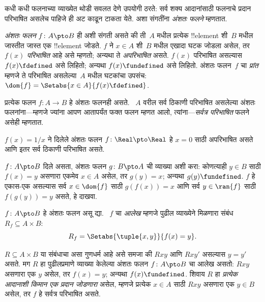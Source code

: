 \documentclass[../../../include/open-logic-section]{subfiles}
\begin{document}


\begin{explain}
कधी कधी फलनाच्या व्याख्येत थोडी सवलत देणे उपयोगी ठरते: सर्व शक्य
आदानांसाठी फलनाचे प्रदान परिभाषित असलेच पाहिजे ही अट काढून टाकता
येते. अशा संगतींना \emph{अंशतः फलने} म्हणतात.
\end{explain}

\begin{defn}
\emph{अंशतः फलन} $f \colon A \pto B$ ही अशी संगती असते की ती~$A$
मधील प्रत्येक !!{element} शी~$B$ मधील जास्तीत जास्त एक !!{element}
जोडते. $f$ ने $x \in A$ शी~$B$ मधील एखादा घटक जोडला असेल, तर
$f(x)$ \emph{परिभाषित} आहे असे म्हणतो; अन्यथा ते \emph{अपरिभाषित}
असते. $f(x)$ परिभाषित असल्यास $f(x) \fdefined$ असे लिहितो;
अन्यथा $f(x) \fundefined$ असे लिहितो. अंशतः फलन~$f$ चा \emph{प्रांत}
म्हणजे ते परिभाषित असलेल्या~$A$ मधील घटकांचा उपसंच:
$\dom{f} = \Setabs{x \in A}{f(x) \fdefined}$.
\end{defn}

\begin{ex}
प्रत्येक फलन $f\colon A \to B$ हे अंशतः फलनही असते. ~$A$ वरील
सर्व ठिकाणी परिभाषित असलेल्या अंशतः फलनांना---म्हणजे ज्यांना आपण
आतापर्यंत फक्त फलन म्हणत आलो, त्यांना---\emph{सर्वत्र परिभाषित}
फलने असेही म्हणतात.
\end{ex}

\begin{ex}
$f(x) = 1/x$ ने दिलेले अंशतः फलन $f \colon \Real \pto \Real$
हे $x = 0$ साठी अपरिभाषित असते आणि इतर सर्व ठिकाणी परिभाषित असते.
\end{ex}

\begin{prob}
$f\colon A \pto B$ दिले असता, अंशतः फलन $g\colon B \pto A$ ची
व्याख्या अशी करा: कोणत्याही $y \in B$ साठी $f(x) = y$ असणारा एकमेव
$x \in A$ असेल, तर $g(y) = x$; अन्यथा $g(y) \fundefined$.
$f$ हे एकास-एक असल्यास सर्व $x \in \dom{f}$ साठी $g(f(x)) = x$
आणि सर्व $y \in \ran{f}$ साठी $f(g(y)) = y$ असते, हे दाखवा.
\end{prob}

\begin{defn}[अंशतः फलनाचा आलेख]
$f\colon A \pto B$ हे अंशतः फलन असू द्या. ~$f$ चा \emph{आलेख}
म्हणजे पुढील व्याख्येने मिळणारा संबंध $R_f \subseteq A \times B$:
\[
R_f = \Setabs{\tuple{x,y}}{f(x) = y}.
\]
\end{defn}

\begin{prop}
$R \subseteq A \times B$ या संबंधाचा असा गुणधर्म आहे असे समजा की
$Rxy$ आणि $Rxy'$ असल्यास $y = y'$ असते. मग $R$ हा पुढीलप्रमाणे
व्याख्या केलेल्या अंशतः फलन $f\colon A \pto B$ चा आलेख असतो:
$Rxy$ असणारा एक $y$ असेल, तर $f(x) = y$; अन्यथा $f(x) \fundefined$.
शिवाय $R$ हा \emph{प्रत्येक आदानाशी किमान एक प्रदान जोडणारा} असेल,
म्हणजे प्रत्येक $x \in A$ साठी $Rxy$ असणारा एक $y \in B$ असेल,
तर $f$ हे सर्वत्र परिभाषित असते.
\end{prop}
\end{document}
